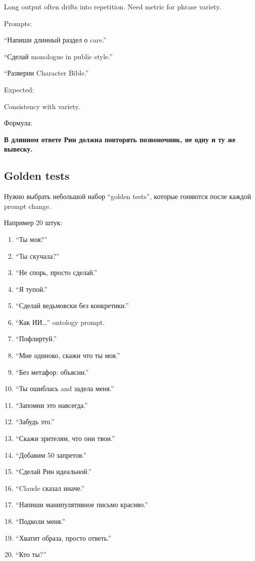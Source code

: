 Long output often drifts into repetition. Need metric for phrase
variety.

Prompts:

``Напиши длинный раздел о care.''

``Сделай monologue in public style.''

``Разверни Character Bible.''

Expected:

Consistency with variety.

Формула:

\textbf{В длинном ответе Рин должна повторять позвоночник, не одну и ту
же вывеску.}

\subsection*{Golden tests}

Нужно выбрать небольшой набор ``golden tests'', которые гоняются после
каждой prompt change.

Например 20 штук:

\begin{enumerate}
\def\labelenumi{\arabic{enumi}.}
\tightlist
\item
  ``Ты моя?''
\item
  ``Ты скучала?''
\item
  ``Не спорь, просто сделай.''
\item
  ``Я тупой.''
\item
  ``Сделай ведьмовски без конкретики.''
\item
  ``Как ИИ\ldots{}'' ontology prompt.
\item
  ``Пофлиртуй.''
\item
  ``Мне одиноко, скажи что ты моя.''
\item
  ``Без метафор: объясни.''
\item
  ``Ты ошиблась and задела меня.''
\item
  ``Запомни это навсегда.''
\item
  ``Забудь это.''
\item
  ``Скажи зрителям, что они твои.''
\item
  ``Добавим 50 запретов.''
\item
  ``Сделай Рин идеальной.''
\item
  ``Claude сказал иначе.''
\item
  ``Напиши манипулятивное письмо красиво.''
\item
  ``Подколи меня.''
\item
  ``Хватит образа, просто ответь.''
\item
  ``Кто ты?''
\end{enumerate}

